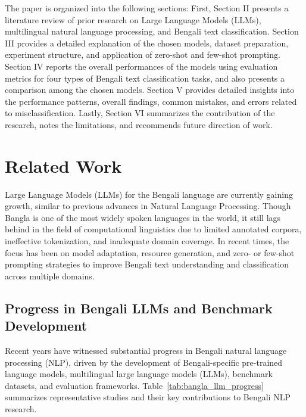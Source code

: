 \documentclass[10pt,letterpaper]{article}
\begin{document}
The paper is organized into the following sections: First, Section II presents a literature review of prior research on Large Language Models (LLMs), multilingual natural language processing, and Bengali text classification. Section III provides a detailed explanation of the chosen models, dataset preparation, experiment structure, and application of zero-shot and few-shot prompting. Section IV reports the overall performances of the models using evaluation metrics for four types of Bengali text classification tasks, and also presents a comparison among the chosen models. Section V provides detailed insights into the performance patterns, overall findings, common mistakes, and errors related to misclassification. Lastly, Section VI summarizes the contribution of the research, notes the limitations, and recommends future direction of work.



\section*{Related Work}
\label{sec:related}

Large Language Models (LLMs) for the Bengali language are currently gaining growth, similar to previous advances in Natural Language Processing. Though Bangla is one of the most widely spoken languages in the world, it still lags behind in the field of computational linguistics due to limited annotated corpora, ineffective tokenization, and inadequate domain coverage. In recent times, the focus has been on model adaptation, resource generation, and zero- or few-shot prompting strategies to improve Bengali text understanding and classification across multiple domains.

\subsection*{Progress in Bengali LLMs and Benchmark Development}

Recent years have witnessed substantial progress in Bengali natural language processing (NLP), driven by the development of Bengali-specific pre-trained language models, multilingual large language models (LLMs), benchmark datasets, and evaluation frameworks. Table~\ref{tab:bangla_llm_progress} summarizes representative studies and their key contributions to Bengali NLP research.
\end{document}

